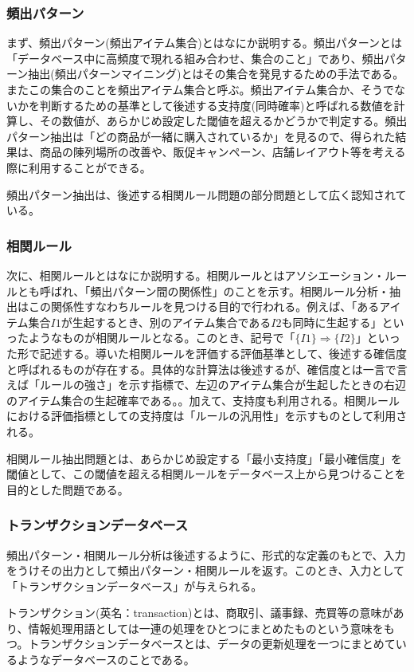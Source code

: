 \documentclass[dvipdfmx]{jsarticle}
\begin{document}
\subsubsection{頻出パターン}
まず、頻出パターン(頻出アイテム集合)とはなにか説明する。頻出パターンとは「データベース中に高頻度で現れる組み合わせ、集合のこと」であり、頻出パターン抽出(頻出パターンマイニング)とはその集合を発見するための手法である。またこの集合のことを頻出アイテム集合と呼ぶ。頻出アイテム集合か、そうでないかを判断するための基準として後述する支持度(同時確率)と呼ばれる数値を計算し、その数値が、あらかじめ設定した閾値を超えるかどうかで判定する。頻出パターン抽出は「どの商品が一緒に購入されているか」を見るので、得られた結果は、商品の陳列場所の改善や、販促キャンペーン、店舗レイアウト等を考える際に利用することができる。\par
頻出パターン抽出は、後述する相関ルール問題の部分問題として広く認知されている。
\subsubsection{相関ルール}
次に、相関ルールとはなにか説明する。相関ルールとはアソシエーション・ルールとも呼ばれ、「頻出パターン間の関係性」のことを示す。相関ルール分析・抽出はこの関係性すなわちルールを見つける目的で行われる。例えば、「あるアイテム集合$I1$が生起するとき、別のアイテム集合である$I2$も同時に生起する」といったようなものが相関ルールとなる。このとき、記号で「$\{I1\} \Rightarrow \{I2\}$」といった形で記述する。導いた相関ルールを評価する評価基準として、後述する確信度と呼ばれるものが存在する。具体的な計算法は後述するが、確信度とは一言で言えば「ルールの強さ」を示す指標で、左辺のアイテム集合が生起したときの右辺のアイテム集合の生起確率である。。加えて、支持度も利用される。相関ルールにおける評価指標としての支持度は「ルールの汎用性」を示すものとして利用される。\par
相関ルール抽出問題とは、あらかじめ設定する「最小支持度」「最小確信度」を閾値として、この閾値を超える相関ルールをデータベース上から見つけることを目的とした問題である。
\subsubsection{トランザクションデータベース}
頻出パターン・相関ルール分析は後述するように、形式的な定義のもとで、入力をうけその出力として頻出パターン・相関ルールを返す。このとき、入力として「トランザクションデータベース」が与えられる。\par
トランザクション(英名：transaction)とは、商取引、議事録、売買等の意味があり、情報処理用語としては一連の処理をひとつにまとめたものという意味をもつ。トランザクションデータベースとは、データの更新処理を一つにまとめているようなデータベースのことである。
\end{document}
